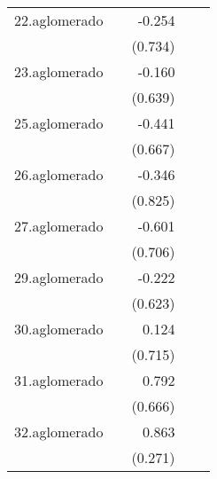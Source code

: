 {\begin{longtable}{l*{4}{D{.}{.}{-1}}}
\addlinespace
22.aglomerado&                     &      -0.254         &                     &                     \\
            &                     &     (0.734)         &                     &                     \\
\addlinespace
23.aglomerado&                     &      -0.160         &                     &                     \\
            &                     &     (0.639)         &                     &                     \\
\addlinespace
25.aglomerado&                     &      -0.441         &                     &                     \\
            &                     &     (0.667)         &                     &                     \\
\addlinespace
26.aglomerado&                     &      -0.346         &                     &                     \\
            &                     &     (0.825)         &                     &                     \\
\addlinespace
27.aglomerado&                     &      -0.601         &                     &                     \\
            &                     &     (0.706)         &                     &                     \\
\addlinespace
29.aglomerado&                     &      -0.222         &                     &                     \\
            &                     &     (0.623)         &                     &                     \\
\addlinespace
30.aglomerado&                     &       0.124         &                     &                     \\
            &                     &     (0.715)         &                     &                     \\
\addlinespace
31.aglomerado&                     &       0.792         &                     &                     \\
            &                     &     (0.666)         &                     &                     \\
\addlinespace
32.aglomerado&                     &       0.863\sym{**} &                     &                     \\
            &                     &     (0.271)         &                     &                     \\

\end{longtable}}
